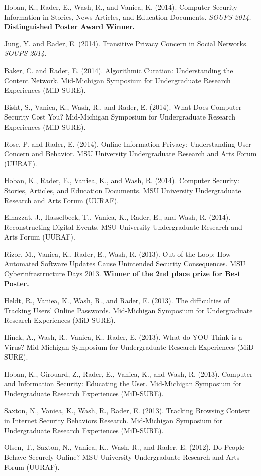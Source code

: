 \documentclass[9pt]{extarticle}
\begin{document}
Hoban, K., Rader, E., Wash, R., and Vaniea, K. (2014). Computer Security Information in Stories, News Articles, and Education Documents. \emph{SOUPS 2014.} \textbf{Distinguished Poster Award Winner.}

Jung, Y. and Rader, E. (2014). Transitive Privacy Concern in Social Networks. \emph{SOUPS 2014.}

Baker, C. and Rader, E. (2014). Algorithmic Curation: Understanding the Content Network. Mid-Michigan Symposium for Undergraduate Research Experiences (MiD-SURE).

Bisht, S., Vaniea, K., Wash, R., and Rader, E. (2014). What Does Computer Security Cost You? Mid-Michigan Symposium for Undergraduate Research Experiences (MiD-SURE).

Rose, P. and Rader, E. (2014). Online Information Privacy: Understanding User Concern and Behavior. MSU University Undergraduate Research and Arts Forum (UURAF).

Hoban, K., Rader, E., Vaniea, K., and Wash, R. (2014). Computer Security: Stories, Articles, and Education Documents. MSU University Undergraduate Research and Arts Forum (UURAF).

Elhazzat, J., Hasselbeck, T., Vaniea, K., Rader, E., and Wash, R. (2014). Reconstructing Digital Events. MSU University Undergraduate Research and Arts Forum (UURAF).

Rizor, M., Vaniea, K., Rader, E., Wash, R. (2013). Out of the Loop: How Automated Software Updates Cause Unintended Security Consequences. MSU Cyberinfrastructure Days 2013. \textbf{Winner of the 2nd place prize for Best Poster.}

Heldt, R., Vaniea, K., Wash, R., and Rader, E. (2013). The difficulties of Tracking Users' Online Passwords. Mid-Michigan Symposium for Undergraduate Research Experiences (MiD-SURE). 

Hinck, A., Wash, R., Vaniea, K., Rader, E. (2013). What do YOU Think is a Virus? Mid-Michigan Symposium for Undergraduate Research Experiences (MiD-SURE).

Hoban, K., Girouard, Z., Rader, E., Vaniea, K., and Wash, R. (2013). Computer and Information Security: Educating the User. Mid-Michigan Symposium for Undergraduate Research Experiences (MiD-SURE).

Saxton, N., Vaniea, K., Wash, R., Rader, E. (2013). Tracking Browsing Context in Internet Security Behaviors Research. Mid-Michigan Symposium for Undergraduate Research Experiences (MiD-SURE).

Olsen, T., Saxton, N., Vaniea, K., Wash, R., and Rader, E. (2012). Do People Behave Securely Online? MSU University Undergraduate Research and Arts Forum (UURAF).
\end{document}
